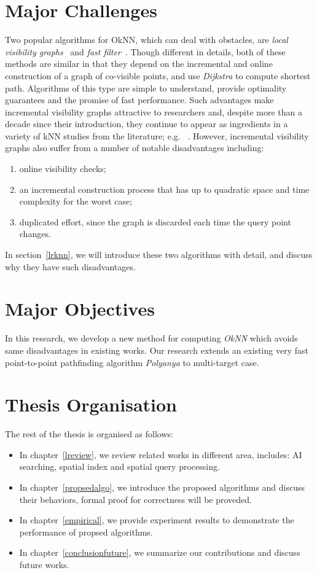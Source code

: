 \section{Major Challenges}
Two popular algorithms for OkNN, which can deal with obstacles, are
\emph{local visibility graphs}~\cite{zhang2004spatial} and \emph{fast
filter}~\cite{xia2004fast}. Though different in details, both of these methods
are similar in that they depend on the incremental and online construction of 
a graph of co-visible points, and use \textit{Dijkstra} to compute shortest path.
Algorithms of this type are simple to understand, 
provide optimality guarantees and the promise of fast performance. 
Such advantages make incremental visibility graphs attractive to researchers 
and, despite more than a decade since their introduction, they continue to 
appear as ingredients in a variety of kNN studies from the literature; e.g. 
~\cite{gao2011efficient,gao2016reverse,gao2009continuous}.
However, incremental visibility graphs also suffer from a number of notable 
disadvantages including:

\begin{enumerate}
  \item online visibility checks;
  \item an incremental construction process that has up to quadratic space and time complexity for the worst case;
  \item duplicated effort, since the graph is discarded each time the query 
  point changes.
\end{enumerate}

In section~\ref{lrknn}, we will introduce these two algorithms with detail,
and discuss why they have such disadvantages.

\section{Major Objectives}
In this research, we develop a new method for computing \emph{OkNN} which avoids same
disadvantages in existing works. Our research extends an existing very fast point-to-point
pathfinding algorithm \emph{Polyanya} to multi-target case.

\section{Thesis Organisation}
The rest of the thesis is organised as follows:
\begin{itemize}
  \item In chapter~\ref{lreview}, we review related works in different area, includes: AI
    searching, spatial index and spatial query processing.
  \item In chapter~\ref{propsedalgo}, we introduce the proposed algorithms and discuss their
    behaviors, formal proof for correctness will be proveded.
  \item In chapter~\ref{empirical}, we provide experiment results to demonstrate the
    performance of propsed algorithms.
  \item In chapter~\ref{conclusionfuture}, we summarize our contributions and discuss future
    works.
\end{itemize}
